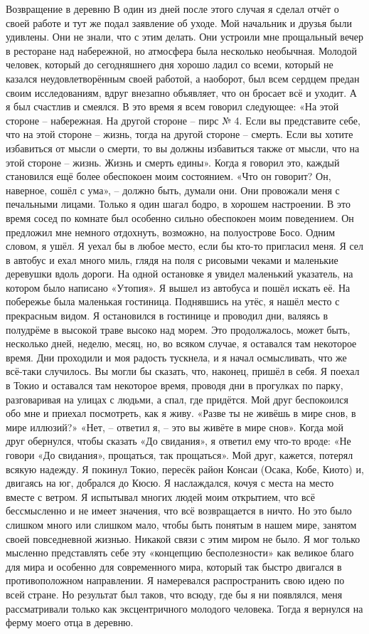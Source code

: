 \documentclass[a4paper]{book}
\begin{document}
Возвращение в деревню
В один из дней после этого случая я сделал отчёт о своей работе и тут же подал
заявление об уходе. Мой начальник и друзья были удивлены. Они не знали, что с этим делать.
Они устроили мне прощальный вечер в ресторане над набережной, но атмосфера была
несколько необычная. Молодой человек, который до сегодняшнего дня хорошо ладил со
всеми, который не казался неудовлетворённым своей работой, а наоборот, был всем сердцем
предан своим исследованиям, вдруг внезапно объявляет, что он бросает всё и уходит. А я был
счастлив и смеялся.
В это время я всем говорил следующее: «На этой стороне – набережная. На другой
стороне – пирс № 4. Если вы представите себе, что на этой стороне – жизнь, тогда на другой
стороне – смерть. Если вы хотите избавиться от мысли о смерти, то вы должны избавиться
также от мысли, что на этой стороне – жизнь. Жизнь и смерть едины».
Когда я говорил это, каждый становился ещё более обеспокоен моим состоянием. «Что
он говорит? Он, наверное, сошёл с ума», – должно быть, думали они. Они провожали меня с
печальными лицами. Только я один шагал бодро, в хорошем настроении.
В это время сосед по комнате был особенно сильно обеспокоен моим поведением. Он
предложил мне немного отдохнуть, возможно, на полуострове Босо. Одним словом, я ушёл. Я
уехал бы в любое место, если бы кто-то пригласил меня. Я сел в автобус и ехал много миль,
глядя на поля с рисовыми чеками и маленькие деревушки вдоль дороги. На одной остановке
я увидел маленький указатель, на котором было написано «Утопия». Я вышел из автобуса и
пошёл искать её.
На побережье была маленькая гостиница. Поднявшись на утёс, я нашёл место с
прекрасным видом. Я остановился в гостинице и проводил дни, валяясь в полудрёме в
высокой траве высоко над морем. Это продолжалось, может быть, несколько дней, неделю,
месяц, но, во всяком случае, я оставался там некоторое время. Дни проходили и моя радость
тускнела, и я начал осмысливать, что же всё-таки случилось. Вы могли бы сказать, что,
наконец, пришёл в себя.
Я поехал в Токио и оставался там некоторое время, проводя дни в прогулках по парку,
разговаривая на улицах с людьми, а спал, где придётся. Мой друг беспокоился обо мне и
приехал посмотреть, как я живу. «Разве ты не живёшь в мире снов, в мире иллюзий?» «Нет, –
ответил я, – это вы живёте в мире снов». Когда мой друг обернулся, чтобы сказать «До
свидания», я ответил ему что-то вроде: «Не говори «До свидания», прощаться, так
прощаться». Мой друг, кажется, потерял всякую надежду.
Я покинул Токио, пересёк район Консаи (Осака, Кобе, Киото) и, двигаясь на юг,
добрался до Кюсю. Я наслаждался, кочуя с места на место вместе с ветром. Я испытывал
многих людей моим открытием, что всё бессмысленно и не имеет значения, что всё
возвращается в ничто. Но это было слишком много или слишком мало, чтобы быть понятым
в нашем мире, занятом своей повседневной жизнью. Никакой связи с этим миром не было. Я
мог только мысленно представлять себе эту «концепцию бесполезности» как великое благо
для мира и особенно для современного мира, который так быстро двигался в
противоположном направлении. Я намеревался распространить свою идею по всей стране.
Но результат был таков, что всюду, где бы я ни появлялся, меня рассматривали только как
эксцентричного молодого человека. Тогда я вернулся на ферму моего отца в деревню.
\end{document}
